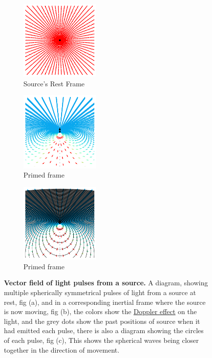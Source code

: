 \begin{figure}[H]
	\begin{subfigure}{.325\textwidth}
		\centering
		\includegraphics[width = 3.95cm]{images/pdf/Field_Rest_Frame.pdf}
		\caption{Source's Rest Frame}
		\label{fig: vector field of light source rest frame}
	\end{subfigure}
	\begin{subfigure}{.325\textwidth}
		\centering
		\includegraphics[width = 3.95cm]{images/pdf/Field_Moving_Frame_Doppler.pdf}
		\caption{Primed frame}
		\label{fig: vector field of light source primed frame}
	\end{subfigure}
	\begin{subfigure}{.325\textwidth}
		\centering
		\includegraphics[width = 3.95cm]{images/pdf/Field_Moving_Frame_Doppler_circles.pdf}
		\caption{Primed frame}
		\label{fig: vector field of light source with rings}
	\end{subfigure}
	\caption{\textbf{Vector field of light pulses from a source.} A diagram, showing multiple spherically symmetrical pulses of light from a source at rest, fig (a), and in a corresponding inertial frame where the source is now moving, fig (b), the colors show the \protect\hyperlink{def-doppler-effect}{Doppler effect} on the light, and the grey dots show the past positions of source when it had emitted each pulse, there is also a diagram showing the circles of each pulse, fig (c), This shows the spherical waves being closer together in the direction of movement.} %
	\label{fig: vector field of light source}
\end{figure}



